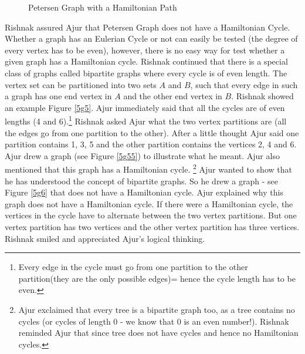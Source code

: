 \begin{figure}
\begin{center}
\caption{ Petersen Graph with a Hamiltonian Path}\label{5g4}
\end{center}
\end{figure}
Rishnak assured Ajur that Petersen Graph does not have a Hamiltonian Cycle. Whether a graph has an Eulerian Cycle or not can easily be tested (the degree of every vertex has to be even), however, there is no easy way for test whether a given graph has a Hamiltonian cycle. 
Rishnak continued that there is a special class of graphs called bipartite graphs where every cycle is of even length. The vertex set can be partitioned into two sets $A$ and $B$, such that every edge in such a graph has one end vertex in $A$ and the other end vertex in $B$. Rishnak showed an example Figure \ref{5g5}. Ajur immediately said that all the cycles are of even lengths (4 and 6).\footnote{Every edge in the cycle must go from one partition to the other partition(they are the only possible edges)= hence the cycle length has to be even.} Rishnak asked Ajur what the two vertex partitions are (all the edges go from one partition to the other). After a little thought Ajur said one partition contains 1, 3, 5 and the other partition contains the vertices 2, 4 and 6. Ajur drew a graph (see Figure \ref{5g55}) to illustrate  what he meant. Ajur also mentioned that this graph has a Hamiltonian cycle. \footnote{Ajur exclaimed that every tree is a bipartite graph too, as a tree contains no cycles (or cycles of length 0 - we know that 0 is an even number!). Rishnak reminded Ajur that since tree does not have cycles and hence no Hamiltonian cycles.} 
Ajur wanted to show that he has understood the concept of bipartite graphs. So he drew a graph - see Figure \ref{5g6} that does not have a Hamiltonian cycle. Ajur explained why this graph does not have a Hamiltonian cycle. If there were a Hamiltonian cycle, the vertices in the cycle have to alternate between the two vertex partitions. But one vertex partition has two vertices and the other vertex partition has three vertices. Rishnak smiled and appreciated Ajur's logical thinking.

